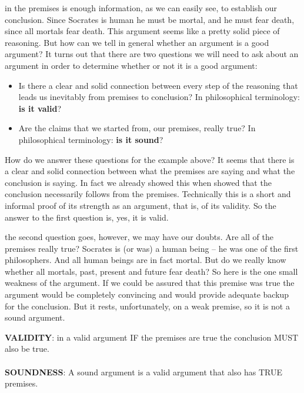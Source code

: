 \documentclass[justified]{tufte-book}
\begin{document}
 in the premises is enough information, as we can easily see, to establish our conclusion. Since Socrates is human he must be mortal, and he must fear death, since all mortals fear death. This argument seems like a pretty solid piece of reasoning. But how can we tell in general whether an argument is a good argument? It turns out that there are two questions we will need to ask about an argument in order to determine whether or not it is a good argument:

\begin{itemize}
\item
  Is there a clear and solid connection between every step of the reasoning that leads us inevitably from premises to conclusion? In philosophical terminology: \textbf{is it valid}?
\item
  Are the claims that we started from, our premises, really true? In philosophical terminology: \textbf{is it sound}?
\end{itemize}

How do we answer these questions for the example above? It seems that there is a clear and solid connection between what the premises are saying and what the conclusion is saying. In fact we already showed this when showed that the conclusion necessarily follows from the premises. Technically this is a short and informal proof of its strength as an argument, that is, of its validity. So the answer to the first question is, yes, it is valid.

 the second question goes, however, we may have our doubts. Are all of the premises really true? Socrates is (or was) a human being -- he was one of the first philosophers. And all human beings are in fact mortal. But do we really know whether all mortals, past, present and future fear death? So here is the one small weakness of the argument. If we could be assured that this premise was true the argument would be completely convincing and would provide adequate backup for the conclusion. But it rests, unfortunately, on a weak premise, so it is not a sound argument.

\begin{marginfigure}
\textbf{VALIDITY}: in a valid argument IF the premises are true the
conclusion MUST also be true.\\
~\\
\textbf{SOUNDNESS}: A sound argument is a valid argument that also has
TRUE premises.
\end{marginfigure}
\end{document}
